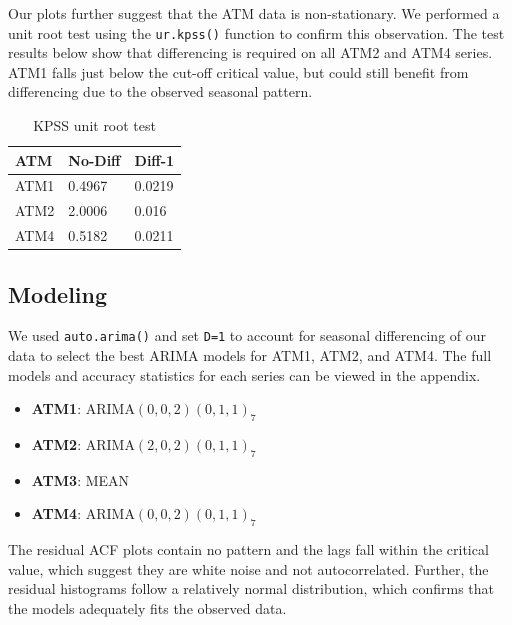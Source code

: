 \documentclass[openany]{book}
\providecommand{\tightlist}{%
  \setlength{\itemsep}{0pt}\setlength{\parskip}{0pt}}
\begin{document}
Our plots further suggest that the ATM data is non-stationary. We
performed a unit root test using the \texttt{ur.kpss()} function to
confirm this observation. The test results below show that differencing
is required on all ATM2 and ATM4 series. ATM1 falls just below the
cut-off critical value, but could still benefit from differencing due to
the observed seasonal pattern.

\begin{table}[H]

\caption{\label{tab:unnamed-chunk-6}KPSS unit root test}
\centering
\begin{tabular}{l|l|l}
\hline
\textbf{ATM} & \textbf{No-Diff} & \textbf{Diff-1}\\
\hline
\rowcolor{gray!6}  ATM1 & 0.4967 & 0.0219\\
\hline
ATM2 & 2.0006 & 0.016\\
\hline
\rowcolor{gray!6}  ATM4 & 0.5182 & 0.0211\\
\hline
\end{tabular}
\end{table}

\hypertarget{modeling}{%
\subsection{Modeling}\label{modeling}}

We used \texttt{auto.arima()} and set \texttt{D=1} to account for
seasonal differencing of our data to select the best ARIMA models for
ATM1, ATM2, and ATM4. The full models and accuracy statistics for each
series can be viewed in the appendix.

\begin{itemize}
\tightlist
\item
  \textbf{ATM1}: ARIMA\((0,0,2)(0,1,1)_7\)
\item
  \textbf{ATM2}: ARIMA\((2,0,2)(0,1,1)_7\)
\item
  \textbf{ATM3}: MEAN
\item
  \textbf{ATM4}: ARIMA\((0,0,2)(0,1,1)_7\)
\end{itemize}

The residual ACF plots contain no pattern and the lags fall within the
critical value, which suggest they are white noise and not
autocorrelated. Further, the residual histograms follow a relatively
normal distribution, which confirms that the models adequately fits the
observed data.
\end{document}
